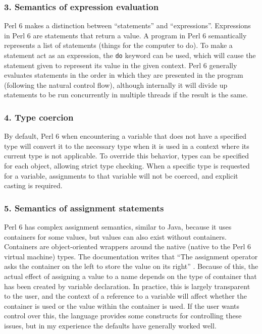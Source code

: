 \documentclass[14pt,english]{extarticle}
\begin{document}
\subsubsection*{3. Semantics of expression evaluation}

Perl 6 makes a distinction between ``statements'' and ``expressions''.
Expressions in Perl 6 are statements that return a value. A program
in Perl 6 semantically represents a list of statements (things for
the computer to do). To make a statement act as an expression, the
\texttt{do} keyword can be used, which will cause the statement given
to represent its value in the given context. Perl 6 generally evaluates
statements in the order in which they are presented in the program
(following the natural control flow), although internally it will
divide up statements to be run concurrently in multiple threads if
the result is the same.


\subsubsection*{4. Type coercion}

By default, Perl 6 when encountering a variable that does not have
a specified type will convert it to the necessary type when it is
used in a context where its current type is not applicable. To override
this behavior, types can be specified for each object, allowing strict
type checking. When a specific type is requested for a variable, assignments
to that variable will not be coerced, and explicit casting is required.


\subsubsection*{5. Semantics of assignment statements}

Perl 6 has complex assignment semantics, similar to Java, because
it uses containers for some values, but values can also exist without
containers. Containers are object-oriented wrappers around the native
(native to the Perl 6 virtual machine) types. The documentation writes
that ``The assignment operator asks the container on the left to
store the value on its right'' \cite{Documentation}. Because of
this, the actual effect of assigning a value to a name depends on
the type of container that has been created by variable declaration.
In practice, this is largely transparent to the user, and the context
of a reference to a variable will affect whether the container is
used or the value within the container is used. If the user wants
control over this, the language provides some constructs for controlling
these issues, but in my experience the defaults have generally worked
well.
\end{document}
